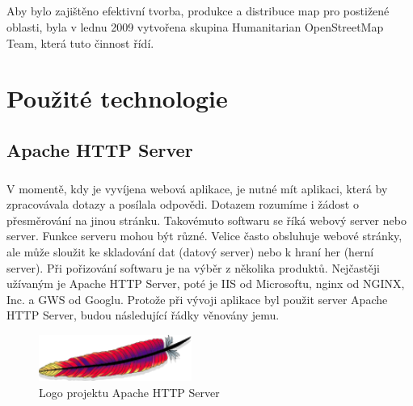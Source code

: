\documentclass[11pt,a4paper,titlepage,oneside]{book}
\begin{document}
		\paragraph{} Aby bylo zajištěno efektivní tvorba, produkce a distribuce map pro postižené oblasti, byla v lednu 2009 vytvořena skupina Humanitarian OpenStreetMap Team\cite{wiki_hot}, která tuto činnost řídí.
	

\chapter{Použité technologie}
	\section{Apache HTTP Server}
		\paragraph{} V momentě, kdy je vyvíjena webová aplikace, je nutné mít aplikaci, která by zpracovávala dotazy a posílala odpovědi. Dotazem rozumíme i žádost o přesměrování na jinou stránku. Takovémuto softwaru se říká webový server nebo server. Funkce serveru mohou být různé. Velice často obsluhuje webové stránky, ale může sloužit ke skladování dat (datový server) nebo k hraní her (herní server). Při pořizování softwaru je na výběr z několika produktů. Nejčastěji užívaným je Apache HTTP Server, poté je IIS od Microsoftu, nginx od NGINX, Inc. a GWS od Googlu. Protože při vývoji aplikace byl použit server Apache HTTP Server, budou následující řádky věnovány jemu.
		\begin{figure}[!h]
			\begin{center}
				\includegraphics[width=5cm]{obrazky/apacheLogo.png}
				\caption{Logo projektu Apache HTTP Server}
			\end{center}
		\end{figure}
\end{document}
